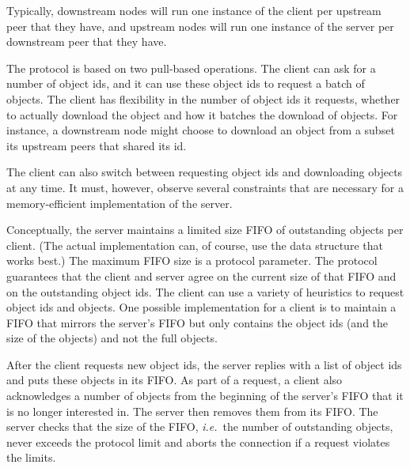 Typically, downstream nodes will run one instance of the client per upstream
peer that they have, and upstream nodes will run one instance of the server per
downstream peer that they have.

The protocol is based on two pull-based operations. The client can ask for a
number of object ids, and it can use these object ids to request a batch of
objects. The client has flexibility in the number of object ids it requests,
whether to actually download the object and how it batches the download of
objects. For instance, a downstream node might choose to download an object from
a subset its upstream peers that shared its id.

The client can also switch between requesting object ids and downloading objects
at any time. It must, however, observe several constraints that are necessary
for a memory-efficient implementation of the server.

Conceptually, the server maintains a limited size FIFO of outstanding objects
per client. (The actual implementation can, of course, use the data structure
that works best.) The maximum FIFO size is a protocol parameter. The protocol
guarantees that the client and server agree on the current size of that FIFO and
on the outstanding object ids. The client can use a variety of heuristics to
request object ids and objects. One possible implementation for a client is to
maintain a FIFO that mirrors the server's FIFO but only contains the object ids
(and the size of the objects) and not the full objects.

After the client requests new object ids, the server replies with a list of
object ids and puts these objects in its FIFO. As part of a request, a client
also acknowledges a number of objects from the beginning of the server's FIFO
that it is no longer interested in. The server then removes them from its FIFO.
The server checks that the size of the FIFO, {\em i.e.}\ the number of
outstanding objects, never exceeds the protocol limit and aborts the connection
if a request violates the limits.%
%

